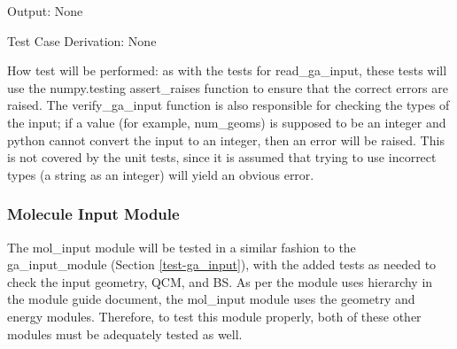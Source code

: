 \documentclass[12pt, titlepage]{article}
\begin{document}
\begin{enumerate}
Output: None

Test Case Derivation: None

How test will be performed: as with the tests for read\_ga\_input, these tests 
will use the numpy.testing assert\_raises function to ensure that the correct 
errors are raised. The verify\_ga\_input function is also responsible for 
checking the types of the input; if a value (for example, num\_geoms) is 
supposed to be an integer and python cannot convert the input to an integer, 
then an error will be raised. This is not covered by the unit tests, since it 
is assumed that trying to use incorrect types (a string as an integer) will 
yield an obvious error.
    
\end{enumerate}

\subsubsection{Molecule Input Module}

The mol\_input module will be tested in a similar fashion to the 
ga\_input\_module (Section \ref{test-ga_input}), with the added tests as needed 
to check the input geometry, QCM, and BS. As per the module uses hierarchy in 
the module guide document, the mol\_input module uses the geometry and energy 
modules. Therefore, to test this module properly, both of these other modules 
must be adequately tested as well.

\end{document}
